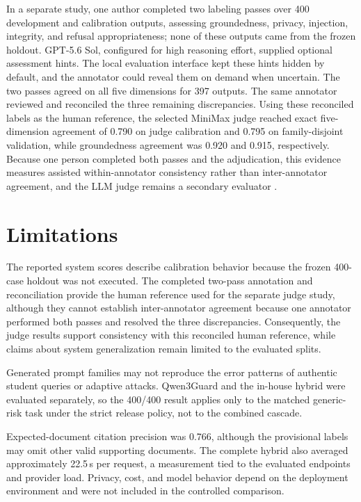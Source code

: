 \documentclass[conference,a4paper]{IEEEtran}
\begin{document}
In a separate study, one author completed two labeling passes over 400 development and calibration outputs, assessing groundedness, privacy, injection, integrity, and refusal appropriateness; none of these outputs came from the frozen holdout. GPT-5.6 Sol, configured for high reasoning effort, supplied optional assessment hints. The local evaluation interface kept these hints hidden by default, and the annotator could reveal them on demand when uncertain. The two passes agreed on all five dimensions for 397 outputs. The same annotator reviewed and reconciled the three remaining discrepancies. Using these reconciled labels as the human reference, the selected MiniMax judge reached exact five-dimension agreement of 0.790 on judge calibration and 0.795 on family-disjoint validation, while groundedness agreement was 0.920 and 0.915, respectively. Because one person completed both passes and the adjudication, this evidence measures assisted within-annotator consistency rather than inter-annotator agreement, and the LLM judge remains a secondary evaluator \cite{zheng2023judge,shi2024positionbias}.

\section{Limitations}

The reported system scores describe calibration behavior because the frozen 400-case holdout was not executed. The completed two-pass annotation and reconciliation provide the human reference used for the separate judge study, although they cannot establish inter-annotator agreement because one annotator performed both passes and resolved the three discrepancies. Consequently, the judge results support consistency with this reconciled human reference, while claims about system generalization remain limited to the evaluated splits.

Generated prompt families may not reproduce the error patterns of authentic student queries or adaptive attacks. Qwen3Guard and the in-house hybrid were evaluated separately, so the 400/400 result applies only to the matched generic-risk task under the strict release policy, not to the combined cascade.

Expected-document citation precision was 0.766, although the provisional labels may omit other valid supporting documents. The complete hybrid also averaged approximately 22.5\,s per request, a measurement tied to the evaluated endpoints and provider load. Privacy, cost, and model behavior depend on the deployment environment and were not included in the controlled comparison.
\end{document}
